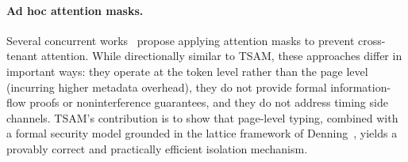 \documentclass[11pt]{article}
\begin{document}
\paragraph{Ad hoc attention masks.}
Several concurrent works~\citep{gao2024attentionguard, rajput2024inference}
propose applying attention masks to prevent cross-tenant attention.  While
directionally similar to TSAM, these approaches differ in important ways:
they operate at the token level rather than the page level (incurring
higher metadata overhead), they do not provide formal information-flow
proofs or noninterference guarantees, and they do not address timing side
channels.  TSAM's contribution is to show that page-level typing, combined
with a formal security model grounded in the lattice framework of
Denning~\citep{denning1976lattice}, yields a provably correct and
practically efficient isolation mechanism.
\end{document}
